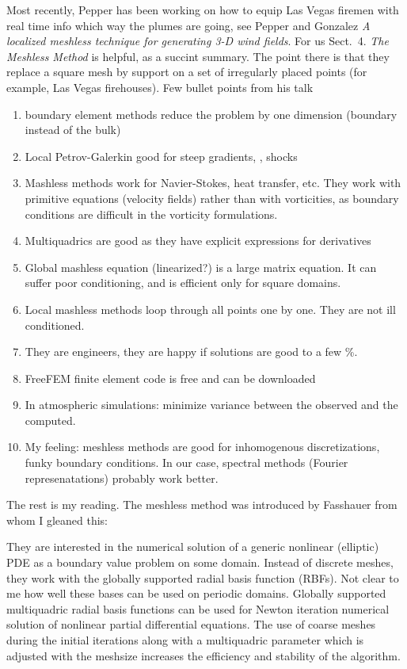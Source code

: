 \begin{description}
{Most recently, Pepper has been working on how to
equip Las Vegas firemen with real time info which way the plumes are going, see
Pepper and Gonzalez {\em A localized meshless technique for
generating {3-D} wind fields}. For us Sect.~4. {\em The Meshless Method} is
helpful, as a succint summary. The point there is that they replace a
square mesh by support on a set of irregularly placed points (for
example, Las Vegas firehouses). Few bullet points from his talk

\begin{enumerate}
  \item
boundary element methods reduce the problem by one dimension (boundary
instead of the bulk)
  \item
Local Petrov-Galerkin good for steep gradients, \ie, shocks
  \item
Mashless methods work for Navier-Stokes, heat transfer, etc. They work
with primitive equations (velocity fields) rather than with vorticities,
as boundary conditions are difficult in the vorticity formulations.
  \item
Multiquadrics are good as they have explicit expressions for derivatives
  \item
Global mashless equation (linearized?) is a large matrix equation.
It can suffer poor conditioning, and is
efficient only for square domains.
  \item
Local mashless methods loop through all points one by one. They are
not ill conditioned.
  \item
They are engineers, they are happy if solutions are good to a few \%.
  \item
FreeFEM finite element code is free and can be downloaded
  \item
In atmospheric simulations: minimize variance between the observed and
the computed.
  \item
My feeling: meshless methods are good for inhomogenous discretizations, funky
boundary conditions. In our case, spectral methods (Fourier represenatations)
probably work better.
\end{enumerate}

The rest is my reading.
The meshless method was introduced by Fasshauer from whom
I gleaned this:

    They are interested in the numerical solution of a generic nonlinear
    (elliptic) PDE as a boundary value problem on some domain. Instead of
    discrete meshes, they work with the globally supported radial basis
    function (RBFs). Not clear to me how well these bases can be used on
    periodic domains. Globally supported multiquadric radial basis
    functions can be used for Newton iteration numerical solution of
    nonlinear partial differential equations. The use of coarse meshes
    during the initial iterations along with a multiquadric parameter
    which is adjusted with the meshsize increases the efficiency and
    stability of the algorithm.

}
\end{description}
